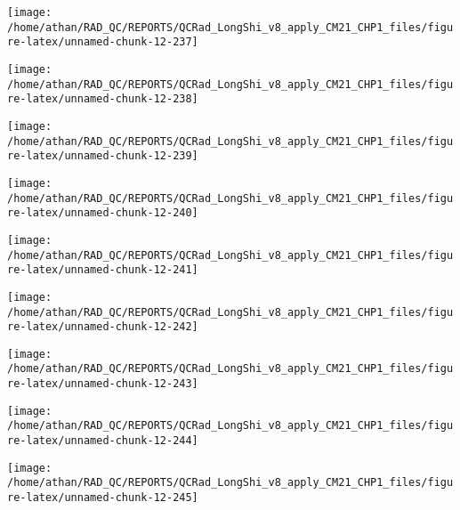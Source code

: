 \documentclass[
  10pt,
  a4paper,oneside]{article}
\begin{document}
\begin{center}\texttt{[image: /home/athan/RAD\_QC/REPORTS/QCRad\_LongShi\_v8\_apply\_CM21\_CHP1\_files/figure-latex/unnamed-chunk-12-237]} \end{center}

\begin{center}\texttt{[image: /home/athan/RAD\_QC/REPORTS/QCRad\_LongShi\_v8\_apply\_CM21\_CHP1\_files/figure-latex/unnamed-chunk-12-238]} \end{center}

\begin{center}\texttt{[image: /home/athan/RAD\_QC/REPORTS/QCRad\_LongShi\_v8\_apply\_CM21\_CHP1\_files/figure-latex/unnamed-chunk-12-239]} \end{center}

\begin{center}\texttt{[image: /home/athan/RAD\_QC/REPORTS/QCRad\_LongShi\_v8\_apply\_CM21\_CHP1\_files/figure-latex/unnamed-chunk-12-240]} \end{center}

\begin{center}\texttt{[image: /home/athan/RAD\_QC/REPORTS/QCRad\_LongShi\_v8\_apply\_CM21\_CHP1\_files/figure-latex/unnamed-chunk-12-241]} \end{center}

\begin{center}\texttt{[image: /home/athan/RAD\_QC/REPORTS/QCRad\_LongShi\_v8\_apply\_CM21\_CHP1\_files/figure-latex/unnamed-chunk-12-242]} \end{center}

\begin{center}\texttt{[image: /home/athan/RAD\_QC/REPORTS/QCRad\_LongShi\_v8\_apply\_CM21\_CHP1\_files/figure-latex/unnamed-chunk-12-243]} \end{center}

\begin{center}\texttt{[image: /home/athan/RAD\_QC/REPORTS/QCRad\_LongShi\_v8\_apply\_CM21\_CHP1\_files/figure-latex/unnamed-chunk-12-244]} \end{center}

\begin{center}\texttt{[image: /home/athan/RAD\_QC/REPORTS/QCRad\_LongShi\_v8\_apply\_CM21\_CHP1\_files/figure-latex/unnamed-chunk-12-245]} \end{center}
\end{document}
